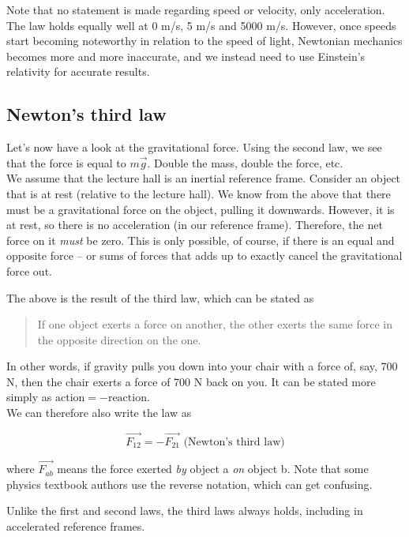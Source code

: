 Note that no statement is made regarding speed or velocity, only acceleration. The law holds equally well at 0 m/s, 5 m/s and 5000 m/s. However, once speeds start becoming noteworthy in relation to the speed of light, Newtonian mechanics becomes more and more inaccurate, and we instead need to use Einstein's relativity for accurate results. 

\subsection{Newton's third law}

Let's now have a look at the gravitational force. Using the second law, we see that the force is equal to $m \vec{g}$. Double the mass, double the force, etc.\\
We assume that the lecture hall is an inertial reference frame. Consider an object that is at rest (relative to the lecture hall). We know from the above that there must be a gravitational force on the object, pulling it downwards. However, it is at rest, so there is no acceleration (in our reference frame). Therefore, the net force on it \emph{must} be zero. This is only possible, of course, if there is an equal and opposite force -- or sums of forces that adds up to exactly cancel the gravitational force out.

The above is the result of the third law, which can be stated as

\begin{quote}
If one object exerts a force on another, the other exerts the same force in the opposite direction on the one.
\end{quote}

In other words, if gravity pulls you down into your chair with a force of, say, 700 N, then the chair exerts a force of 700 N back on you. It can be stated more simply as $\text{action} = -\text{reaction}$.\\
We can therefore also write the law as

\begin{equation}
\vec{F_{12}} = -\vec{F_{21}} \text{ (Newton's third law)} \label{eq:newton3}
\end{equation}

where $\vec{F_{ab}}$ means the force exerted \emph{by} object a \emph{on} object b. Note that some physics textbook authors use the reverse notation, which can get confusing.

Unlike the first and second laws, the third laws always holds, including in accelerated reference frames.


